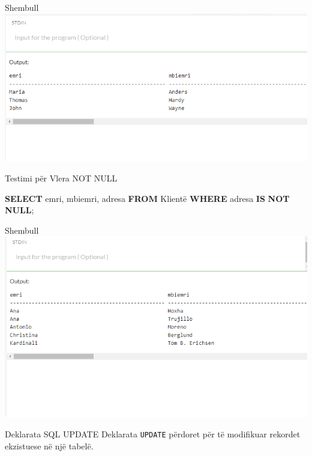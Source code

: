 \documentclass[
  ignorenonframetext,
]{beamer}
\newenvironment{Shaded}{\begin{snugshade}}{\end{snugshade}}
\newcommand{\KeywordTok}[1]{\textcolor[rgb]{0.13,0.29,0.53}{\textbf{#1}}}
\newcommand{\NormalTok}[1]{#1}
\begin{document}
\begin{frame}{Shembull}
\label{shembull-8}
\includegraphics{./Figs/query33}
\end{frame}

\begin{frame}[fragile]{Testimi për Vlera NOT NULL}
\label{testimi-puxebr-vlera-not-null}

\begin{Shaded}
\begin{Highlighting}[]
\KeywordTok{SELECT}\NormalTok{ emri, mbiemri, adresa}
\KeywordTok{FROM}\NormalTok{ Klientë}
\KeywordTok{WHERE}\NormalTok{ adresa }\KeywordTok{IS} \KeywordTok{NOT} \KeywordTok{NULL}\NormalTok{;}
\end{Highlighting}
\end{Shaded}
\end{frame}

\begin{frame}{Shembull}
\label{shembull-9}
\includegraphics{./Figs/query34}
\end{frame}

\begin{frame}[fragile]{Deklarata SQL UPDATE}
\label{deklarata-sql-update}
Deklarata \texttt{UPDATE} përdoret për të modifikuar rekordet ekzistuese
në një tabelë.
\end{frame}
\end{document}
